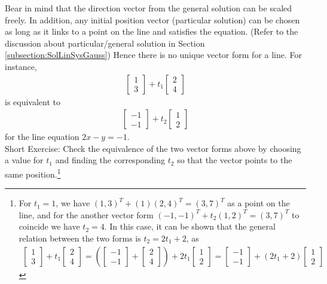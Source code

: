 Bear in mind that the direction vector from the general solution can be scaled freely. In addition, any initial position vector (particular solution) can be chosen as long as it links to a point on the line and satisfies the equation. (Refer to the discussion about particular/general solution in Section \ref{subsection:SolLinSysGauss}) Hence there is no unique vector form for a line. For instance,
\begin{align*}
\begin{bmatrix}
1\\
3
\end{bmatrix}
+ t_1
\begin{bmatrix}
2 \\
4
\end{bmatrix}     
\end{align*}
is equivalent to
\begin{align*}
\begin{bmatrix}
-1\\
-1
\end{bmatrix}
+ t_2
\begin{bmatrix}
1 \\
2
\end{bmatrix}     
\end{align*}
for the line equation $2x - y = -1$.\\
Short Exercise: Check the equivalence of the two vector forms above by choosing a value for $t_1$ and finding the corresponding $t_2$ so that the vector points to the same position.\footnote{For $t_1 = 1$, we have $(1, 3)^T + (1)(2, 4)^T = (3 ,7)^T$ as a point on the line, and for the another vector form $(-1,-1)^T + t_2(1, 2)^T = (3 ,7)^T$ to coincide we have $t_2 = 4$. In this case, it can be shown that the general relation between the two forms is $t_2 = 2t_1 + 2$, as
\begin{align*}
\begin{bmatrix}
1\\
3
\end{bmatrix}
+ t_1
\begin{bmatrix}
2 \\
4
\end{bmatrix}
=
\left(
\begin{bmatrix}
-1\\
-1
\end{bmatrix}
+
\begin{bmatrix}
2 \\
4
\end{bmatrix}
\right)
+ 2t_1
\begin{bmatrix}
1 \\
2
\end{bmatrix}
=
\begin{bmatrix}
-1\\
-1
\end{bmatrix}
+ (2t_1+2)
\begin{bmatrix}
1 \\
2
\end{bmatrix}
\end{align*}}\\
